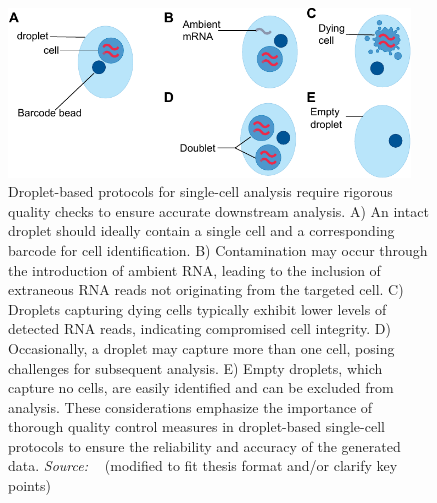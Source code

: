\begin{figure}[!ht]
	\centering
	\includegraphics[width=0.95\textwidth]{QC_cells/fig}
	\vspace{0.1cm}
	\caption[Droplets-based sequencing of dying cells, doublet and empty droplet .]{Droplet-based protocols for single-cell analysis require rigorous quality checks to ensure accurate downstream analysis. A) An intact droplet should ideally contain a single cell and a corresponding barcode for cell identification. B) Contamination may occur through the introduction of ambient RNA, leading to the inclusion of extraneous RNA reads not originating from the targeted cell. C) Droplets capturing dying cells typically exhibit lower levels of detected RNA reads, indicating compromised cell integrity. D) Occasionally, a droplet may capture more than one cell, posing challenges for subsequent analysis. E) Empty droplets, which capture no cells, are easily identified and can be excluded from analysis. These considerations emphasize the importance of thorough quality control measures in droplet-based single-cell protocols to ensure the reliability and accuracy of the generated data. \emph{Source: ~\cite{heumos2023best}} (modified to fit thesis format and/or clarify key points)}
	\label{fig:QCcells}
\end{figure}
